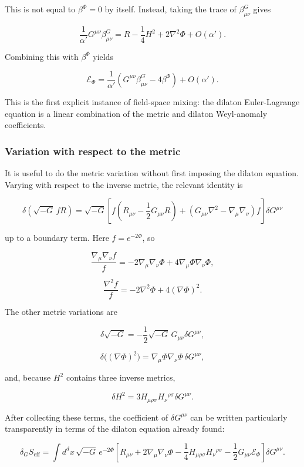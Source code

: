 \documentclass[
  10pt,
  a4paper,
  openany]{book}
\begin{document}
This is not equal to \(\beta^\Phi=0\) by itself. Instead, taking the
trace of \(\beta^G_{\mu\nu}\) gives

\[
\frac1{\alpha'}G^{\mu\nu}\beta^G_{\mu\nu}
=
R-\frac14H^2+2\nabla^2\Phi
+O(\alpha').
\]

Combining this with \(\beta^\Phi\) yields

\[
\boxed{
\mathcal E_\Phi
=
\frac1{\alpha'}
\left(
G^{\mu\nu}\beta^G_{\mu\nu}
-4\beta^\Phi
\right)
+O(\alpha').
}
\]

This is the first explicit instance of field-space mixing: the dilaton
Euler-Lagrange equation is a linear combination of the metric and
dilaton Weyl-anomaly coefficients.

\subsubsection{Variation with respect to the
metric}\label{variation-with-respect-to-the-metric}

It is useful to do the metric variation without first imposing the
dilaton equation. Varying with respect to the inverse metric, the
relevant identity is

\[
\delta\!\left(\sqrt{-G}\,fR\right)
=\sqrt{-G}
\left[
f\left(R_{\mu\nu}-\frac12G_{\mu\nu}R\right)
+\left(G_{\mu\nu}\nabla^2-\nabla_\mu\nabla_\nu\right)f
\right]\delta G^{\mu\nu}
\]

up to a boundary term. Here \(f=e^{-2\Phi}\), so

\[
\frac{\nabla_\mu\nabla_\nu f}{f}
=-2\nabla_\mu\nabla_\nu\Phi
+4\nabla_\mu\Phi\nabla_\nu\Phi,
\]

\[
\frac{\nabla^2 f}{f}
=-2\nabla^2\Phi+4(\nabla\Phi)^2.
\]

The other metric variations are

\[
\delta\sqrt{-G}
=-\frac12\sqrt{-G}\,G_{\mu\nu}\delta G^{\mu\nu},
\]

\[
\delta\bigl((\nabla\Phi)^2\bigr)
=\nabla_\mu\Phi\nabla_\nu\Phi\,\delta G^{\mu\nu},
\]

and, because \(H^2\) contains three inverse metrics,

\[
\delta H^2
=3H_{\mu\rho\sigma}H_\nu{}^{\rho\sigma}\delta G^{\mu\nu}.
\]

After collecting these terms, the coefficient of \(\delta G^{\mu\nu}\)
can be written particularly transparently in terms of the dilaton
equation already found:

\[
\delta_GS_{\mathrm{eff}}
=\int d^dx\,\sqrt{-G}\,e^{-2\Phi}
\left[
R_{\mu\nu}
+2\nabla_\mu\nabla_\nu\Phi
-\frac14H_{\mu\rho\sigma}H_\nu{}^{\rho\sigma}
-\frac12G_{\mu\nu}\mathcal E_\Phi
\right]\delta G^{\mu\nu}.
\]
\end{document}
